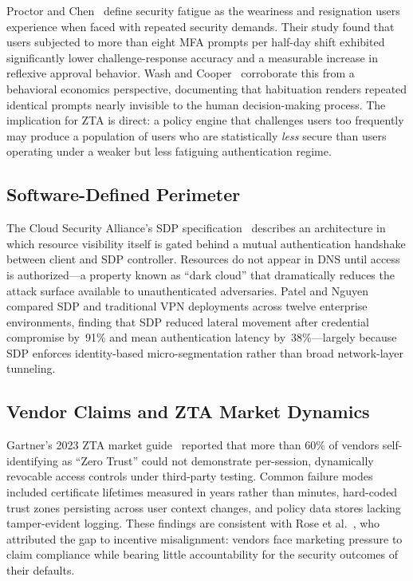 \documentclass[sigconf,nonacm]{acmart}
\begin{document}
Proctor and Chen~\cite{proctor_fatigue2022} define security fatigue as the
weariness and resignation users experience when faced with repeated security
demands. Their study found that users subjected to more than eight MFA prompts
per half-day shift exhibited significantly lower challenge-response accuracy
and a measurable increase in reflexive approval behavior. Wash and
Cooper~\cite{wash_sec_fatigue2022} corroborate this from a behavioral economics
perspective, documenting that habituation renders repeated identical prompts
nearly invisible to the human decision-making process. The implication for ZTA
is direct: a policy engine that challenges users too frequently may produce a
population of users who are statistically \emph{less} secure than users
operating under a weaker but less fatiguing authentication regime.

\subsection{Software-Defined Perimeter}

The Cloud Security Alliance's SDP specification~\cite{csa_sdp2023} describes
an architecture in which resource visibility itself is gated behind a mutual
authentication handshake between client and SDP controller. Resources do not
appear in DNS until access is authorized---a property known as ``dark cloud''
that dramatically reduces the attack surface available to unauthenticated
adversaries. Patel and Nguyen~\cite{patel_sdp_zt2024} compared SDP and
traditional VPN deployments across twelve enterprise environments, finding
that SDP reduced lateral movement after credential compromise by~91\% and
mean authentication latency by~38\%---largely because SDP enforces
identity-based micro-segmentation rather than broad network-layer tunneling.

\subsection{Vendor Claims and ZTA Market Dynamics}

Gartner's 2023 ZTA market guide~\cite{gartner_zt_market2023} reported that more
than 60\% of vendors self-identifying as ``Zero Trust'' could not demonstrate
per-session, dynamically revocable access controls under third-party testing.
Common failure modes included certificate lifetimes measured in years rather
than minutes, hard-coded trust zones persisting across user context changes, and
policy data stores lacking tamper-evident logging. These findings are consistent
with Rose et al.~\cite{rose_zt_pitfalls2022}, who attributed the gap to incentive
misalignment: vendors face marketing pressure to claim compliance while bearing
little accountability for the security outcomes of their defaults.
\end{document}
